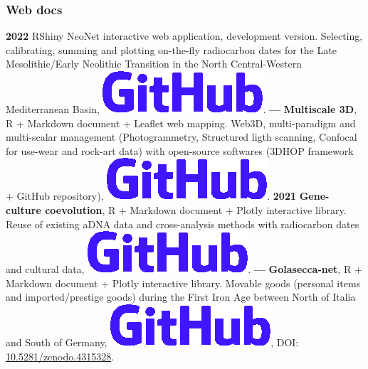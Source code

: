 \documentclass{article}
\begin{document}
\subsubsection*{Web docs}

\textbf{2022 }\textsf{RShiny} NeoNet interactive web application, development version. Selecting, calibrating, summing and plotting on-the-fly radiocarbon dates for the Late Mesolithic/Early Neolithic Transition in the North Central-Western Mediterranean Basin, \href{https://github.com/zoometh/neonet#neonet-app--development-version-}{\includegraphics[scale=0.12]{github-rect.png}}.
\smallbreak
\textbf{--- }\textbf{Multiscale 3D}, \textsf{R} + \textsf{Markdown} document + \textsf{Leaflet} web mapping. Web3D, multi-paradigm and multi-scalar management (Photogrammetry, Structured ligth scanning, Confocal for use-wear and rock-art data) with open-source softwares (\textsf{3DHOP} framework + \textsf{GitHub} repository), \href{https://zoometh.github.io/rockart/}{\includegraphics[scale=0.12]{github-rect.png}}.
\smallbreak
\textbf{2021 }\textbf{Gene-culture coevolution}, \textsf{R} + \textsf{Markdown} document + \textsf{Plotly} interactive library. Reuse of existing aDNA data and cross-analysis methods with radiocarbon dates and cultural data, \href{https://zoometh.github.io/aDNA/}{\includegraphics[scale=0.12]{github-rect.png}}.
\smallbreak
\textbf{--- }\textbf{Golasecca-net}, \textsf{R} + \textsf{Markdown} document + \textsf{Plotly} interactive library. Movable goods (personal items and imported/prestige goods) during the First Iron Age between North of Italia and South of Germany, \href{https://zoometh.github.io/golasecca/}{\includegraphics[scale=0.12]{github-rect.png}}, DOI: \href{https://doi.org/10.5281/zenodo.4315328}{10.5281/zenodo.4315328}.
\end{document}
